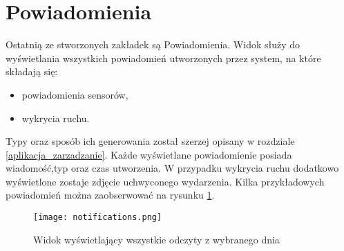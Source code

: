 \section{Powiadomienia} \label{notifications}
Ostatnią ze stworzonych zakładek są Powiadomienia. Widok służy do wyświetlania wszystkich powiadomień utworzonych przez system, na które składają się:
\begin{itemize}
\item powiadomienia sensorów,
\item wykrycia ruchu.
\end{itemize}
 Typy oraz sposób ich generowania został szerzej opisany w rozdziale \ref{aplikacja_zarzadzanie}. Każde wyświetlane powiadomienie posiada wiadomość,typ oraz czas utworzenia. W przypadku wykrycia ruchu dodatkowo wyświetlone zostaje zdjęcie uchwyconego wydarzenia. Kilka przykładowych powiadomień można zaobserwować na rysunku \ref{fig:notifications}.
\begin{figure}[H]
	\centering
	\texttt{[image: notifications.png]}
	\caption{Widok wyświetlający wszystkie odczyty z wybranego dnia}
	\label{fig:notifications}
\end{figure}